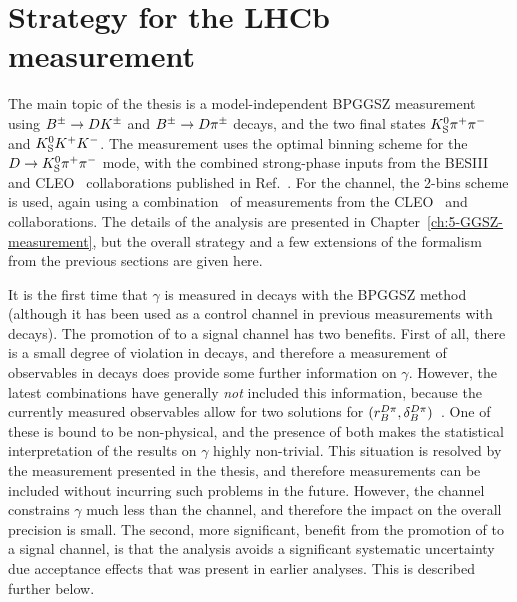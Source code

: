 





\section{Strategy for the LHCb measurement} %
\label{sec:strategy_for_lhcb_measurement}

The main topic of the thesis is a model-independent BPGGSZ measurement using ${{{B}^\pm}\rightarrow{\ensuremath{D}}{\ensuremath{{K}^\pm}}}$ and ${{{B}^\pm}\rightarrow{\ensuremath{D}}{\ensuremath{{\pi}^\pm}}}$ decays, and the two \D final states ${{K}^0_{\mathrm{S}}}{{\pi}^+}{{\pi}^-}$ and ${{K}^0_{\mathrm{S}}}{{K}^+}{{K}^-}$. The measurement uses the optimal binning scheme for the ${D\rightarrow{\ensuremath{{K}^0_{\mathrm{S}}}}{\ensuremath{{\pi}^+}}{\ensuremath{{\pi}^-}}}$ mode, with the combined strong-phase inputs from the BESIII~\cite{BESCISI} and CLEO~\cite{CLEOCISI} collaborations published in Ref.~\cite{BESCISI}. For the \DtoKsKK channel, the 2-bins scheme is used, again using a combination~\cite{BESCISIKSKK} of measurements from the CLEO~\cite{CLEOCISI} and \besiii~\cite{BESCISIKSKK} collaborations. The details of the analysis are presented in Chapter~\ref{ch:5-GGSZ-measurement}, but the overall strategy and a few extensions of the formalism from the previous sections are given here.

It is the first time that $\gamma$ is measured in \BtoDpi decays with the BPGGSZ method (although it has been used as a control channel in previous measurements with \BtoDK decays). The promotion of \BtoDpi to a signal channel has two benefits. First of all, there is a small degree of \CP violation in \BtoDpi decays, and therefore a measurement of \CP observables in \BtoDpi decays does provide some further information on $\gamma$. However, the latest \lhcb combinations have generally \emph{not} included this information, because the currently measured \BtoDpi observables allow for two solutions for $(r_B^{{D}\pi}, \delta_B^{{D}\pi})$~\cite{LHCb-PAPER-2016-032}. One of these is bound to be non-physical, and the presence of both makes the statistical interpretation of the results on $\gamma$ highly non-trivial. This situation is resolved by the measurement presented in the thesis, and therefore \BtoDpi measurements can be included without incurring such problems in the future. However, the \BtoDpi channel constrains $\gamma$ much less than the \BtoDK channel, and therefore the impact on the overall precision is small. The second, more significant, benefit from the promotion of \BtoDpi to a signal channel, is that the analysis avoids a significant systematic uncertainty due \lhcb acceptance effects that was present in earlier analyses. This is described further below.

